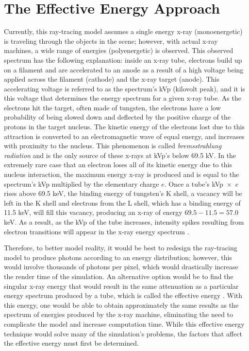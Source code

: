 %

\chapter{The Effective Energy Approach}
\label{cha:xray_tracer_validation}

\par Currently, this ray-tracing model assumes a single energy x-ray (monoenergetic) is traveling through the objects in the scene; however, with actual x-ray machines, a wide range of energies (polyenergetic) is observed. This observed spectrum has the following explanation: inside an x-ray tube, electrons build up on a filament and are accelerated to an anode as a result of a high voltage being applied across the filament (cathode) and the x-ray target (anode). This accelerating voltage is referred to as the spectrum's kVp (kilovolt peak), and it is this voltage that determines the energy spectrum for a given x-ray tube. As the electrons hit the target, often made of tungsten, the electrons have a low probability of being slowed down and deflected by the positive charge of the protons in the target nucleus. The kinetic energy of the electrons lost due to this attraction is converted to an electromagnetic wave of equal energy, and increases with proximity to the nucleus. This phenomenon is called \textit{bremsstrahlung radiation} and is the only source of these x-rays at kVp's below 69.5 kV. In the extremely rare case that an electron loses all of its kinetic energy due to this nucleus interaction, the maximum energy x-ray is produced and is equal to the spectrum's kVp multiplied by the elementary charge $e$. Once a tube's kVp~$\times$~$e$ rises above 69.5 keV, the binding energy of tungsten's K shell, a vacancy will be left in the K shell and electrons from the L shell, which has a binding energy of 11.5 keV, will fill this vacancy, producing an x-ray of energy $69.5 - 11.5 = 57.0$ keV. As a result, as the kVp of the tube increases, intensity spikes resulting from electron transitions will appear in the x-ray energy spectrum \cite{Seibert}.

\par Therefore, to better model reality, it would be best to redesign the ray-tracing model to produce photons according to an energy distribution; however, this would involve thousands of photons per pixel, which would drastically increase the render time of the simulation. An alternative option would be to find the singular x-ray energy that would result in the same attenuation as a particular energy spectrum produced by a tube, which is called the effective energy \cite{Seibert}. With this energy, one would be able to obtain approximately the same results as the spectrum of energies produced by the x-ray machine, eliminating the need to complicate the model and increase computation time. While this effective energy technique would solve many of the simulation's problems, the factors that affect the effective energy must first be determined.

